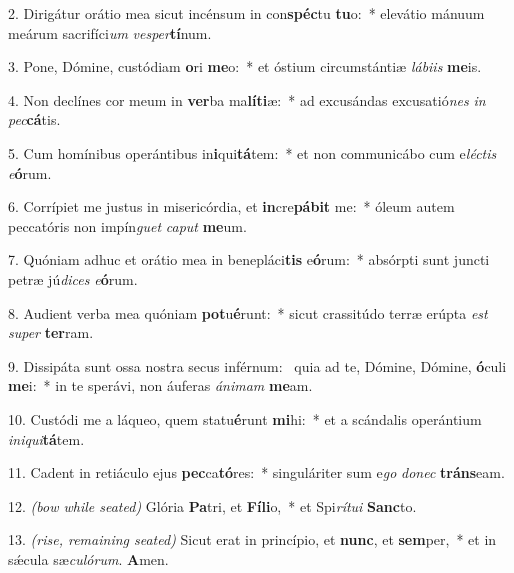 2. Dirigátur orátio mea sicut incénsum in con\textbf{spéc}tu \textbf{tu}o:~* elevátio mánuum meárum sacrifíci\textit{um} \textit{ves}\textit{per}\textbf{tí}num.

3. Pone, Dómine, custódiam \textbf{o}ri \textbf{me}o:~* et óstium circumstántiæ \textit{lá}\textit{bi}\textit{is} \textbf{me}is.

4. Non declínes cor meum in \textbf{ver}ba ma\textbf{lí}\textbf{ti}æ:~* ad excusándas excusatió\textit{nes} \textit{in} \textit{pec}\textbf{cá}tis.

5. Cum homínibus operántibus in\textbf{i}qui\textbf{tá}tem:~* et non communicábo cum e\textit{léc}\textit{tis} \textit{e}\textbf{ó}rum.

6. Corrípiet me justus in misericórdia, et \textbf{in}cre\textbf{pá}\textbf{bit} me:~* óleum autem peccatóris non impín\textit{guet} \textit{ca}\textit{put} \textbf{me}um.

7. Quóniam adhuc et orátio mea in benepláci\textbf{tis} e\textbf{ó}rum:~* absórpti sunt juncti petræ jú\textit{di}\textit{ces} \textit{e}\textbf{ó}rum.

8. Audient verba mea quóniam \textbf{pot}u\textbf{é}runt:~* sicut crassitúdo terræ erúpta \textit{est} \textit{su}\textit{per} \textbf{ter}ram.

9. Dissipáta sunt ossa nostra secus inférnum:~{\color{red}\GreDagger} quia ad te, Dómine, Dómine, \textbf{ó}culi \textbf{me}i:~* in te sperávi, non áuferas \textit{á}\textit{ni}\textit{mam} \textbf{me}am.

10. Custódi me a láqueo, quem statu\textbf{é}runt \textbf{mi}hi:~* et a scándalis operántium \textit{in}\textit{i}\textit{qui}\textbf{tá}tem.

11. Cadent in retiáculo ejus \textbf{pec}ca\textbf{tó}res:~* singuláriter sum e\textit{go} \textit{do}\textit{nec} \textbf{tráns}eam.

12. {\color{red}\textit{(bow while seated)}} Glória \textbf{Pa}tri, et \textbf{Fí}\textbf{li}o,~* et Spi\textit{rí}\textit{tu}\textit{i} \textbf{Sanc}to.

13. {\color{red}\textit{(rise, remaining seated)}} Sicut erat in princípio, et \textbf{nunc}, et \textbf{sem}per,~* et in s\'{\ae}cula sæ\textit{cu}\textit{ló}\textit{rum}. \textbf{A}men.